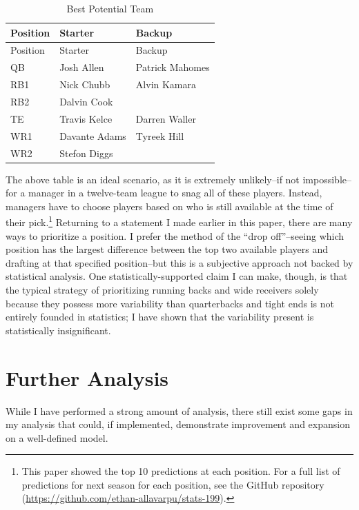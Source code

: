 \documentclass[
]{article}
\begin{document}
\begin{longtable}[]{@{}lll@{}}
\caption{Best Potential Team}\tabularnewline
\toprule
Position & Starter & Backup \\
\midrule
\endfirsthead
\toprule
Position & Starter & Backup \\
\midrule
\endhead
QB & Josh Allen & Patrick Mahomes \\
RB1 & Nick Chubb & Alvin Kamara \\
RB2 & Dalvin Cook & \\
TE & Travis Kelce & Darren Waller \\
WR1 & Davante Adams & Tyreek Hill \\
WR2 & Stefon Diggs & \\
\bottomrule
\end{longtable}

The above table is an ideal scenario, as it is extremely unlikely--if
not impossible--for a manager in a twelve-team league to snag all of
these players. Instead, managers have to choose players based on who is
still available at the time of their pick.\footnote{This paper showed
  the top 10 predictions at each position. For a full list of
  predictions for next season for each position, see the GitHub
  repository (\url{https://github.com/ethan-allavarpu/stats-199}).}
Returning to a statement I made earlier in this paper, there are many
ways to prioritize a position. I prefer the method of the ``drop
off''--seeing which position has the largest difference between the top
two available players and drafting at that specified position--but this
is a subjective approach not backed by statistical analysis. One
statistically-supported claim I can make, though, is that the typical
strategy of prioritizing running backs and wide receivers solely because
they possess more variability than quarterbacks and tight ends is not
entirely founded in statistics; I have shown that the variability
present is statistically insignificant.

\newpage

\hypertarget{further-analysis}{%
\section{Further Analysis}\label{further-analysis}}

While I have performed a strong amount of analysis, there still exist
some gaps in my analysis that could, if implemented, demonstrate
improvement and expansion on a well-defined model.
\end{document}
